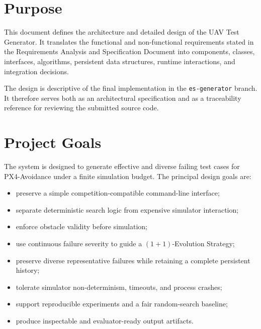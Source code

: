 \documentclass[11pt,a4paper]{report}
\newcommand{\systemname}{UAV Test Generator}
\begin{document}
\section{Purpose}
This document defines the architecture and detailed design of the \systemname. It translates the functional and non-functional requirements stated in the Requirements Analysis and Specification Document into components, classes, interfaces, algorithms, persistent data structures, runtime interactions, and integration decisions.

The design is descriptive of the final implementation in the \texttt{es-generator} branch. It therefore serves both as an architectural specification and as a traceability reference for reviewing the submitted source code.

\section{Project Goals}
The system is designed to generate effective and diverse failing test cases for PX4-Avoidance under a finite simulation budget. The principal design goals are:
\begin{itemize}
  \item preserve a simple competition-compatible command-line interface;
  \item separate deterministic search logic from expensive simulator interaction;
  \item enforce obstacle validity before simulation;
  \item use continuous failure severity to guide a $(1+1)$-Evolution Strategy;
  \item preserve diverse representative failures while retaining a complete persistent history;
  \item tolerate simulator non-determinism, timeouts, and process crashes;
  \item support reproducible experiments and a fair random-search baseline;
  \item produce inspectable and evaluator-ready output artifacts.
\end{itemize}
\end{document}
